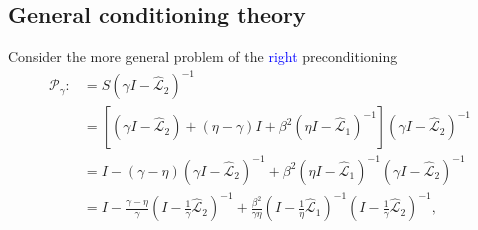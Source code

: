 \documentclass[a4paper,10pt]{article}
\newcommand{\tcb}{\textcolor{blue}}
\begin{document}
{\begin{itemize}
\end{itemize}



\subsection{General conditioning theory}

Consider the more general problem of the \tcb{right} preconditioning 
%
\begin{align}\nonumber
\mathcal{P}_\gamma :&=
S(\gamma I- \widehat{\mathcal{L}}_2)^{-1} \\
& = \left[ (\gamma I - \widehat{\mathcal{L}}_2) + (\eta-\gamma)I +
	\beta^2 (\eta I - \widehat{\mathcal{L}}_1)^{-1}\right]
	(\gamma I - \widehat{\mathcal{L}}_2)^{-1} \\
& = I - (\gamma - \eta)( \gamma I- \widehat{\mathcal{L}}_2)^{-1} + 
	\beta^2( \eta I-\widehat{\mathcal{L}}_1)^{-1}
	( \gamma I- \widehat{\mathcal{L}}_2)^{-1}\nonumber\\
& = I - \frac{\gamma - \eta}{\gamma} ( I- \tfrac{1}{\gamma}\widehat{\mathcal{L}}_2)^{-1} + 
	\frac{\beta^2}{\gamma\eta}( I- \tfrac{1}{\eta}\widehat{\mathcal{L}}_1)^{-1}
	( I- \tfrac{1}{\gamma}\widehat{\mathcal{L}}_2)^{-1},\label{eq:gamma2}
\end{align}




}
\end{document}
